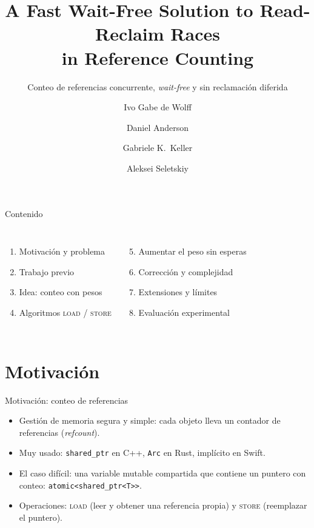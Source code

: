 \documentclass[aspectratio=169,11pt,xcolor=table]{beamer}
\title{A Fast Wait-Free Solution to Read-Reclaim Races\\ in Reference Counting}
\subtitle{Conteo de referencias concurrente, \emph{wait-free} y sin reclamación diferida}
\author{Ivo Gabe de Wolff \and Daniel Anderson \and Gabriele K.\ Keller \and Aleksei Seletskiy}
\institute{Euro-Par 2024 \textperiodcentered{} LNCS 14803, pp.\ 103--118\\[2pt]
  {\scriptsize Presentación del artículo}}
\date{}
\begin{document}
\begin{frame}[plain]
  \titlepage
\end{frame}

\begin{frame}{Contenido}
  \begin{columns}[T]
    \begin{enumerate}
      \item Motivación y problema
      \item Trabajo previo
      \item Idea: conteo con pesos
      \item Algoritmos \textsc{load} / \textsc{store}
    \end{enumerate}
    \begin{enumerate}\setcounter{enumi}{4}
      \item Aumentar el peso sin esperas
      \item Corrección y complejidad
      \item Extensiones y límites
      \item Evaluación experimental
    \end{enumerate}
  \end{columns}
\end{frame}

\section{Motivación}
\begin{frame}{Motivación: conteo de referencias}
  \begin{itemize}
    \item Gestión de memoria segura y simple: cada objeto lleva un \alert{contador de referencias} (\emph{refcount}).
    \item Muy usado: \texttt{shared\_ptr} en C++, \texttt{Arc} en Rust, implícito en Swift.
    \item El caso difícil: una \alert{variable mutable compartida} que contiene un puntero con conteo:
      \texttt{atomic<shared\_ptr<T>{}>}.
    \item Operaciones: \textsc{load} (leer y obtener una referencia propia) y \textsc{store} (reemplazar el puntero).
  \end{itemize}
  \vspace{2mm}
\end{frame}
\end{document}
